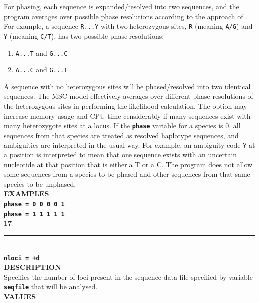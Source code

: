 \documentclass{book}
\numberwithin{equation}{section} \renewcommand{\baselinestretch}{0.55}
\begin{document}
For phasing, each sequence is expanded/resolved into two sequences,
and the program averages over possible phase resolutions according to
the approach of \citet{Gronau2011}.  For example, a sequence
\texttt{R...Y} with two heterozygous sites, \texttt{R} (meaning
\texttt{A/G}) and \texttt{Y} (meaning \texttt{C/T}), has two possible
phase resolutions:
\begin{enumerate}
\item \texttt{A...T} and \texttt{G...C}
\item \texttt{A...C} and \texttt{G...T}
\end{enumerate}
A sequence with no heterozygous sites will be phased/resolved into two
identical sequences.  The MSC model effectively averages over
different phase resolutions of the heterozygous sites in performing
the likelihood calculation.  The option may increase memory usage and
CPU time considerably if many sequences exist with many heterozygote
sites at a locus.  If the \textbf{\texttt{phase}} variable for a
species is 0, all sequences from that species are treated as resolved
haplotype sequences, and ambiguities are interpreted in the usual
way. For example, an ambiguity code \texttt{Y} at a position is
interpreted to mean that one sequence exists with an uncertain
nucleotide at that position that is either a T or a C.  The program
does not allow some sequences from a species to be phased and other
sequences from that same species to be unphased.  \vspace{5pt}\\
\textbf{EXAMPLES} \vspace{5pt}\\
\textbf{\texttt{phase = 0 0 0 0 1}} \vspace{5pt}\\
\textbf{\texttt{phase = 1 1 1 1 1}}\vspace{10pt}\\
\textbf{{\large 17}} \\
\noindent\rule{\textwidth}{0.8pt} \\
\textbf{{\Large \texttt{nloci = +d}}} \vspace{5pt}\\
\textbf{DESCRIPTION} \vspace{5pt}\\
Specifies the number of loci present in the sequence data file
specified by variable \textbf{\texttt{seqfile}}
that will be analysed. \vspace{5pt}\\
\textbf{VALUES} \vspace{5pt}\\
\end{document}
